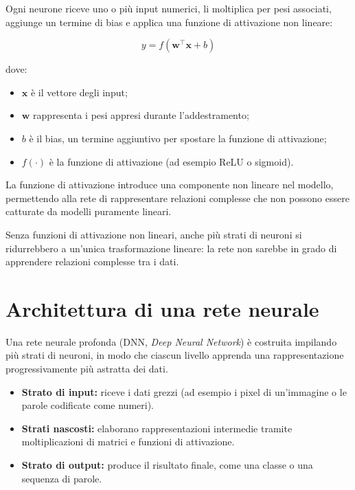 \documentclass[11pt,a4paper]{report}
\begin{document}
Ogni neurone riceve uno o più input numerici, li moltiplica per pesi associati, aggiunge un termine di bias e applica una funzione di attivazione non lineare:

\begin{equation}
y = f(\mathbf{w}^\top \mathbf{x} + b)
\end{equation}

dove:
\begin{itemize}
  \item $\mathbf{x}$ è il vettore degli input;
  \item $\mathbf{w}$ rappresenta i pesi appresi durante l’addestramento;
  \item $b$ è il bias, un termine aggiuntivo per spostare la funzione di attivazione;
  \item $f(\cdot)$ è la funzione di attivazione (ad esempio ReLU o sigmoid).
\end{itemize}

La funzione di attivazione introduce una componente non lineare nel modello, permettendo alla rete di rappresentare relazioni complesse che non possono essere catturate da modelli puramente lineari.

\begin{tcolorbox}[title=Idea chiave]
Senza funzioni di attivazione non lineari, anche più strati di neuroni si ridurrebbero a un’unica trasformazione lineare: la rete non sarebbe in grado di apprendere relazioni complesse tra i dati.
\end{tcolorbox}

\section{Architettura di una rete neurale}

Una rete neurale profonda (DNN, \emph{Deep Neural Network}) è costruita impilando più strati di neuroni, in modo che ciascun livello apprenda una rappresentazione progressivamente più astratta dei dati.

\begin{itemize}
  \item \textbf{Strato di input:} riceve i dati grezzi (ad esempio i pixel di un’immagine o le parole codificate come numeri).
  \item \textbf{Strati nascosti:} elaborano rappresentazioni intermedie tramite moltiplicazioni di matrici e funzioni di attivazione.
  \item \textbf{Strato di output:} produce il risultato finale, come una classe o una sequenza di parole.
\end{itemize}
\end{document}
